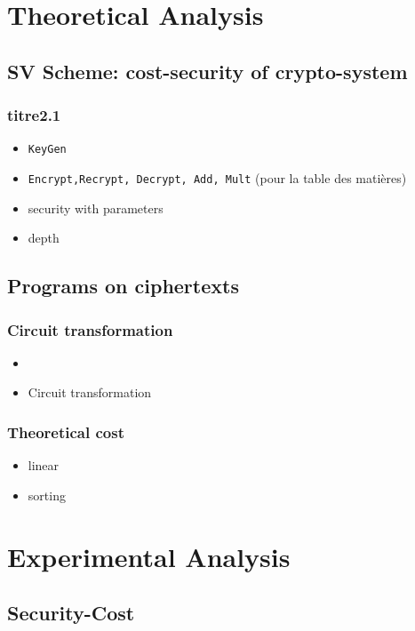 \documentclass{beamer}
\begin{document}
\section{Theoretical Analysis}

\subsection{SV Scheme: cost-security of crypto-system}

\begin{frame} \frametitle{titre2.1}
  \begin{itemize}
  \item {\tt KeyGen}
    \pause
  \item {\tt Encrypt,Recrypt, Decrypt, Add, Mult} (pour la table des matières)

  \pause
  \item security with parameters
  \item depth
  \end{itemize}
\end{frame}

\subsection{Programs on ciphertexts}

\begin{frame} \frametitle{Circuit transformation}
  \begin{itemize}
  \item {}
  \item Circuit transformation
  \end{itemize}
\end{frame}


\begin{frame} 
 \frametitle{Theoretical cost}
  \begin{itemize}
  \item linear
  \item sorting
  \end{itemize}
\end{frame}

\section[Experimental Analysis]{Experimental Analysis}

\subsection{Security-Cost}
\end{document}
